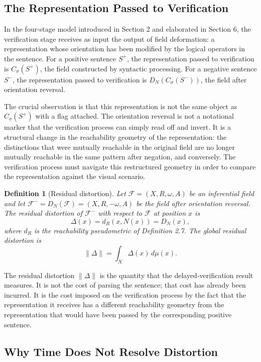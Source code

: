 \documentclass[12pt]{article}
\newtheorem{definition}[theorem]{Definition}
\theoremstyle{remark}
\begin{document}
\subsection{The Representation Passed to Verification}

In the four-stage model introduced in Section 2 and elaborated in Section
6, the verification stage receives as input the output of field
deformation: a representation whose orientation has been modified by the
logical operators in the sentence. For a positive sentence $S^+$, the
representation passed to verification is $C_\sigma(S^+)$, the field
constructed by syntactic processing. For a negative sentence $S^-$, the
representation passed to verification is $D_N(C_\sigma(S^-))$, the field
after orientation reversal.

The crucial observation is that this representation is not the same
object as $C_\sigma(S^+)$ with a flag attached. The orientation reversal
is not a notational marker that the verification process can simply read
off and invert. It is a structural change in the reachability geometry of
the representation: the distinctions that were mutually reachable in the
original field are no longer mutually reachable in the same pattern after
negation, and conversely. The verification process must navigate this
restructured geometry in order to compare the representation against the
visual scenario.

\begin{definition}[Residual distortion]
Let $\mathcal{F} = (X, R, \omega, A)$ be an inferential field and let
$\mathcal{F}^- = D_N(\mathcal{F}) = (X, R, -\omega, A)$ be the field
after orientation reversal. The \emph{residual distortion} of
$\mathcal{F}^-$ with respect to $\mathcal{F}$ at position $x$ is
\[
\Delta(x) = d_R(x, N(x)) = D_N(x),
\]
where $d_R$ is the reachability pseudometric of Definition 2.7. The
\emph{global residual distortion} is
\[
\|\Delta\| = \int_X \Delta(x)\, d\mu(x).
\]
\end{definition}
The residual distortion $\|\Delta\|$ is the quantity that the
delayed-verification result measures. It is not the cost of parsing the
sentence; that cost has already been incurred. It is the cost imposed on
the verification process by the fact that the representation it receives
has a different reachability geometry from the representation that would
have been passed by the corresponding positive sentence.

\subsection{Why Time Does Not Resolve Distortion}
\end{document}
